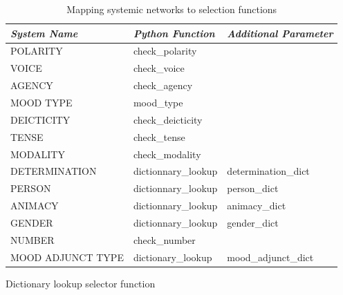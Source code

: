 \begin{table}[!ht]
    \centering
    \begin{tabulary}{\textwidth}{|L|L|L|}
        \hline
        \textit{System Name} & \textit{Python Function}   & \textit{Additional Parameter} \\ \hline
        POLARITY             & check\_polarity     &                               \\ \hline
        VOICE                & check\_voice        &                               \\ \hline
        AGENCY               & check\_agency       &                               \\ \hline
        MOOD TYPE            & mood\_type          &                               \\ \hline
        DEICTICITY           & check\_deicticity   &                               \\ \hline
        TENSE                & check\_tense        &                               \\ \hline
        MODALITY             & check\_modality     &                               \\ \hline
        DETERMINATION        & dictionnary\_lookup & determination\_dict           \\ \hline
        PERSON               & dictionnary\_lookup & person\_dict                  \\ \hline
        ANIMACY              & dictionnary\_lookup & animacy\_dict                 \\ \hline
        GENDER               & dictionnary\_lookup & gender\_dict                  \\ \hline
        NUMBER               & check\_number       &                               \\ \hline
        MOOD ADJUNCT TYPE    & dictionary\_lookup & mood\_adjunct\_dict           \\ \hline
    \end{tabulary}
    \caption{Mapping systemic networks to selection functions}
    \label{tab:system-to-function-mapping}
\end{table}


\begin{algorithm}[!ht]
    \Input {\cg, \dg}
    \caption{Dictionary lookup selector function}
    \label{alg:dictionary-loockup}
\end{algorithm}

